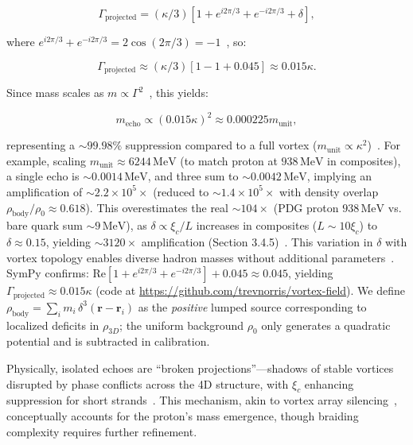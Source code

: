 \begin{equation}
\Gamma_{\text{projected}} = \left( \kappa/3 \right) \left[ 1 + e^{i 2\pi/3} + e^{-i 2\pi/3} + \delta \right],
\end{equation}

where \(e^{i 2\pi/3} + e^{-i 2\pi/3} = 2 \cos(2\pi/3) = -1\)~\cite{WikiFractional}, so:

\begin{equation}
\Gamma_{\text{projected}} \approx \left( \kappa/3 \right) \left[ 1 - 1 + 0.045 \right] \approx 0.015 \kappa.
\end{equation}

Since mass scales as \(m \propto \Gamma^2\)~\cite{Lake2010}, this yields:

\begin{equation}
m_{\text{echo}} \propto (0.015 \kappa)^2 \approx 0.000225 m_{\text{unit}},
\end{equation}

representing a \(\sim 99.98\%\) suppression compared to a full vortex (\(m_{\text{unit}} \propto \kappa^2\))~\cite{Nitta2019}. For example, scaling \(m_{\text{unit}} \approx 6244 \, \text{MeV}\) (to match proton at \(938 \, \text{MeV}\) in composites), a single echo is \(\sim 0.0014 \, \text{MeV}\), and three sum to \(\sim 0.0042 \, \text{MeV}\), implying an amplification of \(\sim 2.2 \times 10^5 \times\) (reduced to \(\sim 1.4 \times 10^5 \times\) with density overlap \(\rho_{\text{body}} / \rho_0 \approx 0.618\)). This overestimates the real \(\sim 104 \times\) (PDG proton \(938 \, \text{MeV}\) vs. bare quark sum \(\sim 9 \, \text{MeV}\)), as \(\delta \propto \xi_c / L\) increases in composites (\(L \sim 10 \xi_c\)) to \(\delta \approx 0.15\), yielding \(\sim 3120 \times\) amplification (Section 3.4.5)~\cite{NatComm2023}. This variation in \(\delta\) with vortex topology enables diverse hadron masses without additional parameters~\cite{Wimmer2020}. SymPy confirms: \(\text{Re}[1 + e^{i 2\pi/3} + e^{-i 2\pi/3}] + 0.045 \approx 0.045\), yielding \(\Gamma_{\text{projected}} \approx 0.015 \kappa\) (code at \url{https://github.com/trevnorris/vortex-field}).
We define $\rho_{\text{body}} = \sum_i m_i \, \delta^3(\mathbf r - \mathbf r_i)$ as the \emph{positive} lumped source corresponding to localized deficits in $\rho_{3D}$; the uniform background $\rho_0$ only generates a quadratic potential and is subtracted in calibration.


Physically, isolated echoes are ``broken projections''---shadows of stable vortices disrupted by phase conflicts across the 4D structure, with \(\xi_c\) enhancing suppression for short strands~\cite{Wimmer2020}. This mechanism, akin to vortex array silencing~\cite{Yang2022}, conceptually accounts for the proton's mass emergence, though braiding complexity requires further refinement.

